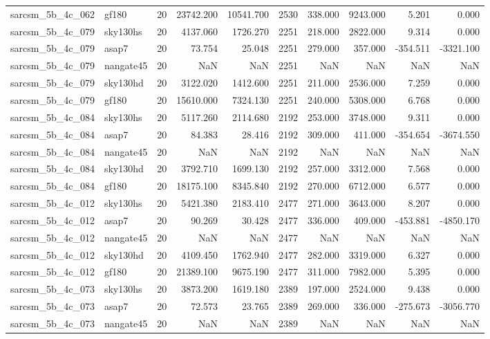 \begin{tabular}{llrrrrrrrr}
sarcsm\_5b\_4c\_062 & gf180 & 20 & 23742.200 & 10541.700 & 2530 & 338.000 & 9243.000 & 5.201 & 0.000 \\
sarcsm\_5b\_4c\_079 & sky130hs & 20 & 4137.060 & 1726.270 & 2251 & 218.000 & 2822.000 & 9.314 & 0.000 \\
sarcsm\_5b\_4c\_079 & asap7 & 20 & 73.754 & 25.048 & 2251 & 279.000 & 357.000 & -354.511 & -3321.100 \\
sarcsm\_5b\_4c\_079 & nangate45 & 20 & NaN & NaN & 2251 & NaN & NaN & NaN & NaN \\
sarcsm\_5b\_4c\_079 & sky130hd & 20 & 3122.020 & 1412.600 & 2251 & 211.000 & 2536.000 & 7.259 & 0.000 \\
sarcsm\_5b\_4c\_079 & gf180 & 20 & 15610.000 & 7324.130 & 2251 & 240.000 & 5308.000 & 6.768 & 0.000 \\
sarcsm\_5b\_4c\_084 & sky130hs & 20 & 5117.260 & 2114.680 & 2192 & 253.000 & 3748.000 & 9.311 & 0.000 \\
sarcsm\_5b\_4c\_084 & asap7 & 20 & 84.383 & 28.416 & 2192 & 309.000 & 411.000 & -354.654 & -3674.550 \\
sarcsm\_5b\_4c\_084 & nangate45 & 20 & NaN & NaN & 2192 & NaN & NaN & NaN & NaN \\
sarcsm\_5b\_4c\_084 & sky130hd & 20 & 3792.710 & 1699.130 & 2192 & 257.000 & 3312.000 & 7.568 & 0.000 \\
sarcsm\_5b\_4c\_084 & gf180 & 20 & 18175.100 & 8345.840 & 2192 & 270.000 & 6712.000 & 6.577 & 0.000 \\
sarcsm\_5b\_4c\_012 & sky130hs & 20 & 5421.380 & 2183.410 & 2477 & 271.000 & 3643.000 & 8.207 & 0.000 \\
sarcsm\_5b\_4c\_012 & asap7 & 20 & 90.269 & 30.428 & 2477 & 336.000 & 409.000 & -453.881 & -4850.170 \\
sarcsm\_5b\_4c\_012 & nangate45 & 20 & NaN & NaN & 2477 & NaN & NaN & NaN & NaN \\
sarcsm\_5b\_4c\_012 & sky130hd & 20 & 4109.450 & 1762.940 & 2477 & 282.000 & 3319.000 & 6.327 & 0.000 \\
sarcsm\_5b\_4c\_012 & gf180 & 20 & 21389.100 & 9675.190 & 2477 & 311.000 & 7982.000 & 5.395 & 0.000 \\
sarcsm\_5b\_4c\_073 & sky130hs & 20 & 3873.200 & 1619.180 & 2389 & 197.000 & 2524.000 & 9.438 & 0.000 \\
sarcsm\_5b\_4c\_073 & asap7 & 20 & 72.573 & 23.765 & 2389 & 269.000 & 336.000 & -275.673 & -3056.770 \\
sarcsm\_5b\_4c\_073 & nangate45 & 20 & NaN & NaN & 2389 & NaN & NaN & NaN & NaN \\

\end{tabular}
